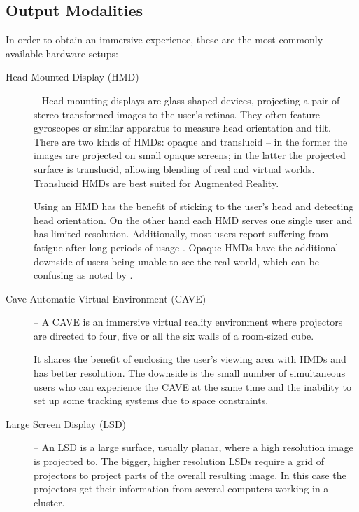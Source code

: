 \subsection{Output Modalities}


In order to obtain an immersive experience, these are the most commonly available hardware setups:

\begin{description}
	\item[Head-Mounted Display (HMD)] --
	  Head-mounting displays are glass-shaped devices, projecting a pair of stereo-transformed images
	  to the user's retinas.
	  They often feature gyroscopes or similar apparatus to measure head orientation and tilt.
	  There are two kinds of HMDs: opaque and translucid --
	  in the former the images are projected on small opaque screens;
	  in the latter the projected surface is translucid, allowing blending of real and virtual worlds.
	  Translucid HMDs are best suited for Augmented Reality.
	  
		Using an HMD has the benefit of sticking to the user's head and detecting head orientation.
		On the other hand each HMD serves one single user and has limited resolution.
		Additionally, most users report suffering from fatigue after long periods of
		usage \cite{VREDUC}.
		Opaque HMDs have the additional downside of users being unable to see the real world, 
		which can be confusing as noted by \cite{VANDERPOL}.
			
	\item[Cave Automatic Virtual Environment (CAVE)] --
	  A CAVE is an immersive virtual reality environment where projectors are directed to four,
	  five or all the six walls of a room-sized cube.
	  
		It shares the benefit of enclosing the user's viewing area with HMDs and has better resolution.
		The downside is the small number of simultaneous users who can experience the CAVE at the same time
		and the inability to set up some tracking systems due to space constraints.
	
	\item[Large Screen Display (LSD)] --
	  An LSD is a large surface, usually planar, where a high resolution image is projected to.
	  The bigger, higher resolution LSDs require a grid of projectors to project parts of the overall resulting image.
	  In this case the projectors get their information from several computers working in a cluster.
	  

\end{description}
